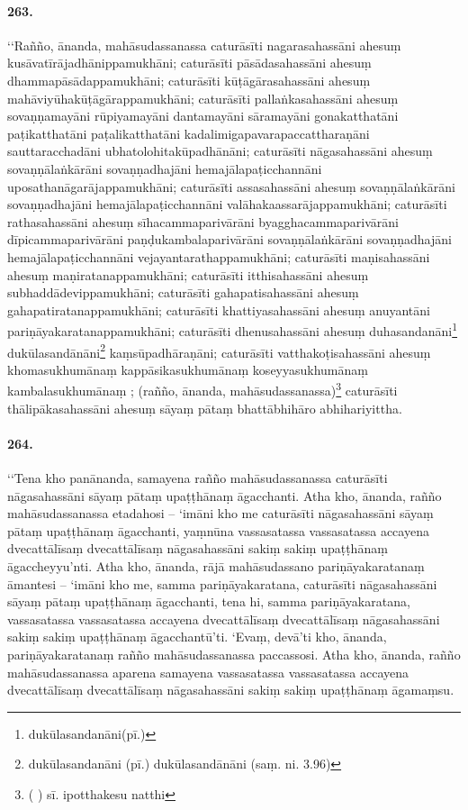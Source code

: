 \paragraph{263.} ‘‘Rañño, ānanda, mahāsudassanassa caturāsīti nagarasahassāni ahesuṃ kusāvatīrājadhānippamukhāni; caturāsīti pāsādasahassāni ahesuṃ dhammapāsādappamukhāni; caturāsīti kūṭāgārasahassāni ahesuṃ mahāviyūhakūṭāgārappamukhāni; caturāsīti pallaṅkasahassāni ahesuṃ sovaṇṇamayāni rūpiyamayāni dantamayāni sāramayāni gonakatthatāni paṭikatthatāni paṭalikatthatāni kadalimigapavarapaccattharaṇāni sauttaracchadāni ubhatolohitakūpadhānāni; caturāsīti nāgasahassāni ahesuṃ sovaṇṇālaṅkārāni sovaṇṇadhajāni hemajālapaṭicchannāni uposathanāgarājappamukhāni; caturāsīti assasahassāni ahesuṃ sovaṇṇālaṅkārāni sovaṇṇadhajāni hemajālapaṭicchannāni valāhakaassarājappamukhāni; caturāsīti rathasahassāni ahesuṃ sīhacammaparivārāni byagghacammaparivārāni dīpicammaparivārāni paṇḍukambalaparivārāni sovaṇṇālaṅkārāni sovaṇṇadhajāni hemajālapaṭicchannāni vejayantarathappamukhāni; caturāsīti maṇisahassāni ahesuṃ maṇiratanappamukhāni; caturāsīti itthisahassāni ahesuṃ subhaddādevippamukhāni; caturāsīti gahapatisahassāni ahesuṃ gahapatiratanappamukhāni; caturāsīti khattiyasahassāni ahesuṃ anuyantāni pariṇāyakaratanappamukhāni; caturāsīti dhenusahassāni ahesuṃ duhasandanāni\footnote{dukūlasandanāni(pī.)} dukūlasandānāni\footnote{dukūlasandanāni (pī.) dukūlasandānāni (saṃ. ni. 3.96)} kaṃsūpadhāraṇāni; caturāsīti vatthakoṭisahassāni ahesuṃ khomasukhumānaṃ kappāsikasukhumānaṃ koseyyasukhumānaṃ kambalasukhumānaṃ ; (rañño, ānanda, mahāsudassanassa)\footnote{( ) sī. ipotthakesu natthi} caturāsīti thālipākasahassāni ahesuṃ sāyaṃ pātaṃ bhattābhihāro abhihariyittha.

\paragraph{264.} ‘‘Tena kho panānanda, samayena rañño mahāsudassanassa caturāsīti nāgasahassāni sāyaṃ pātaṃ upaṭṭhānaṃ āgacchanti. Atha kho, ānanda, rañño mahāsudassanassa etadahosi – ‘imāni kho me caturāsīti nāgasahassāni sāyaṃ pātaṃ upaṭṭhānaṃ āgacchanti, yaṃnūna vassasatassa vassasatassa accayena dvecattālīsaṃ dvecattālīsaṃ nāgasahassāni sakiṃ sakiṃ upaṭṭhānaṃ āgaccheyyu’nti. Atha kho, ānanda, rājā mahāsudassano pariṇāyakaratanaṃ āmantesi – ‘imāni kho me, samma pariṇāyakaratana, caturāsīti nāgasahassāni sāyaṃ pātaṃ upaṭṭhānaṃ āgacchanti, tena hi, samma pariṇāyakaratana, vassasatassa vassasatassa accayena dvecattālīsaṃ dvecattālīsaṃ nāgasahassāni sakiṃ sakiṃ upaṭṭhānaṃ āgacchantū’ti. ‘Evaṃ, devā’ti kho, ānanda, pariṇāyakaratanaṃ rañño mahāsudassanassa paccassosi. Atha kho, ānanda, rañño mahāsudassanassa aparena samayena vassasatassa vassasatassa accayena dvecattālīsaṃ dvecattālīsaṃ nāgasahassāni sakiṃ sakiṃ upaṭṭhānaṃ āgamaṃsu.

